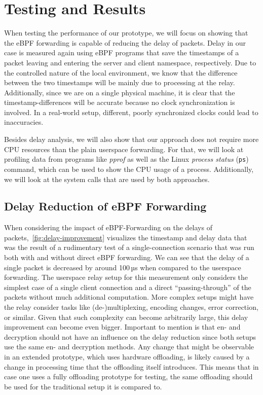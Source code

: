 \section{Testing and Results}\label{sec:testing_and_results}
When testing the performance of our prototype, we will focus on showing that the eBPF forwarding
is capable of reducing the delay of packets.
Delay in our case is measured again using eBPF programs that save the timestamps of a packet 
leaving and entering the server and client namespace, respectively.
Due to the controlled nature of the local environment, we know that the difference 
between the two timestamps will be mainly due to processing at the relay.
Additionally, since we are on a single physical machine, it is clear that the timestamp-differences
will be accurate because no clock synchronization is involved.
In a real-world setup, different, poorly synchronized clocks could lead to inaccuracies.

Besides delay analysis, we will also show that our approach does not require more CPU resources than the plain userspace forwarding.
For that, we will look at profiling data from programs like \textit{pprof} %
as well as the Linux \textit{process status} (\verb|ps|) command, which can be used to 
show the CPU usage of a process. %
Additionally, we will look at the system calls that are used by both approaches.

\subsection{Delay Reduction of eBPF Forwarding}
When considering the impact of eBPF-Forwarding on the delays of packets,~\autoref{fig:delay-improvement}
visualizes the timestamp and delay data that was the result of a rudimentary test of a single-connection 
scenario that was run both with and without direct eBPF forwarding.
We can see that the delay of a single packet is decreased by around 100\,µs
when compared to the userspace forwarding. 
The userspace relay setup for this measurement only considers the simplest case of a single client connection 
and a direct ``passing-through'' of the packets without much additional computation.
More complex setups might have the relay consider tasks like (de-)multiplexing, 
encoding changes, error correction, or similar. 
Given that such complexity can become arbitrarily large, this delay improvement can become even bigger.
Important to mention is that en- and decryption should not have an influence on the delay 
reduction since both setups use the same en- and decryption methods.
Any change that might be observable in an extended prototype, which uses hardware offloading,
is likely caused by a change in processing time that the offloading itself introduces.
This means that in case one uses a fully offloading prototype for testing, the same offloading
should be used for the traditional setup it is compared to.

